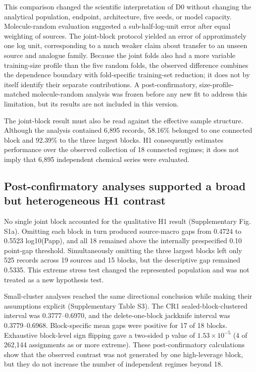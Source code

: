 \documentclass[referee,lineno,pdflatex,Numbered,sn-basic]{sn-jnl}
\begin{document}
This comparison changed the scientific interpretation of D0 without changing the analytical population, endpoint, architecture, five seeds, or model capacity. Molecule-random evaluation suggested a sub-half-log-unit error after equal weighting of sources. The joint-block protocol yielded an error of approximately one log unit, corresponding to a much weaker claim about transfer to an unseen source and analogue family. Because the joint folds also had a more variable training-size profile than the five random folds, the observed difference combines the dependence boundary with fold-specific training-set reduction; it does not by itself identify their separate contributions. A post-confirmatory, size-profile-matched molecule-random analysis was frozen before any new fit to address this limitation, but its results are not included in this version.

The joint-block result must also be read against the effective sample structure. Although the analysis contained 6,895 records, 58.16\% belonged to one connected block and 92.39\% to the three largest blocks. H1 consequently estimates performance over the observed collection of 18 connected regimes; it does not imply that 6,895 independent chemical series were evaluated.

\subsection{Post-confirmatory analyses supported a broad but heterogeneous H1 contrast}

No single joint block accounted for the qualitative H1 result (Supplementary Fig. S1a). Omitting each block in turn produced source-macro gaps from 0.4724 to 0.5523 log10(Papp), and all 18 remained above the internally prespecified 0.10 point-gap threshold. Simultaneously omitting the three largest blocks left only 525 records across 19 sources and 15 blocks, but the descriptive gap remained 0.5335. This extreme stress test changed the represented population and was not treated as a new hypothesis test.

Small-cluster analyses reached the same directional conclusion while making their assumptions explicit (Supplementary Table S3). The CR1 sealed-block-clustered interval was 0.3777--0.6970, and the delete-one-block jackknife interval was 0.3779--0.6968. Block-specific mean gaps were positive for 17 of 18 blocks. Exhaustive block-level sign flipping gave a two-sided p value of $1.53 \times 10^{-5}$ (4 of 262,144 assignments as or more extreme). These post-confirmatory calculations show that the observed contrast was not generated by one high-leverage block, but they do not increase the number of independent regimes beyond 18.
\end{document}
